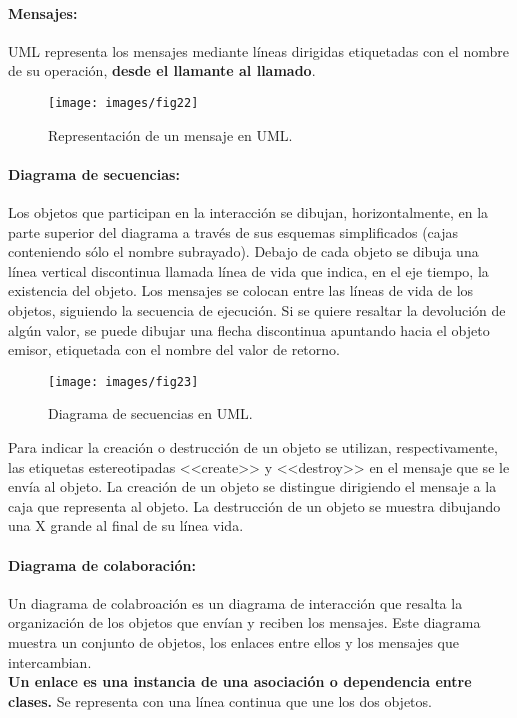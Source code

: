 \vspace{5mm}

\paragraph{Mensajes:}
UML representa los mensajes mediante líneas dirigidas etiquetadas con
el nombre de su operación, \textbf{desde el llamante al llamado}.

\begin{figure}[ht!]  \centering
  \texttt{[image: images/fig22]}
  \caption{Representación de un mensaje en UML.}
  \label{fig:22}
\end{figure}

\paragraph{Diagrama de secuencias:}
Los objetos que participan en la interacción se dibujan,
horizontalmente, en la parte superior del diagrama a través de sus
esquemas simplificados (cajas conteniendo sólo el nombre
subrayado). Debajo de cada objeto se dibuja una línea vertical
discontinua llamada línea de vida que indica, en el eje tiempo, la
existencia del objeto.
Los mensajes se colocan entre las líneas de vida de los objetos,
siguiendo la secuencia de ejecución. Si se quiere resaltar la
devolución de algún valor, se puede dibujar una flecha discontinua
apuntando hacia el objeto emisor, etiquetada con el nombre del valor
de retorno.

\begin{figure}[ht!]  \centering
  \texttt{[image: images/fig23]}
  \caption{Diagrama de secuencias en UML.}
  \label{fig:23}
\end{figure}

Para indicar la creación o destrucción de un objeto se utilizan,
respectivamente, las etiquetas estereotipadas \textrm{<<create>>} y
\textrm{<<destroy>>} en el mensaje que se le envía al objeto. La
creación de un objeto se distingue dirigiendo el mensaje a la caja que
representa al objeto. La destrucción de un objeto se muestra dibujando
una X grande al final de su línea vida.

\paragraph{Diagrama de colaboración:}
Un diagrama de colabroación es un diagrama de interacción que resalta
la organización de los objetos que envían y reciben los mensajes. Este
diagrama muestra un conjunto de objetos, los enlaces entre ellos y los
mensajes que intercambian.\\
\textbf{Un enlace es una instancia de una asociación o dependencia entre
  clases.} Se representa con una línea continua que une los dos
objetos.

